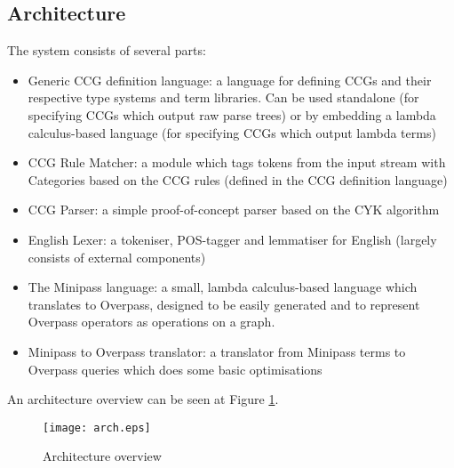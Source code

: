 \documentclass[main.tex]{subfiles}
\begin{document}
\subsection{Architecture}
The system consists of several parts:
\begin{itemize}
    \item Generic CCG definition language: a language for defining CCGs and
          their respective type systems and term libraries. Can be used
          standalone (for specifying CCGs which output raw parse trees)
          or by embedding a lambda calculus-based language (for specifying
          CCGs which output lambda terms)

    \item CCG Rule Matcher: a module which tags tokens from the input stream
          with Categories based on the CCG rules (defined in the CCG definition
          language)

    \item CCG Parser: a simple proof-of-concept parser based on the CYK
          algorithm

    \item English Lexer: a tokeniser, POS-tagger and lemmatiser for English
          (largely consists of external components)

    \item The Minipass language: a small, lambda calculus-based language
          which translates to Overpass, designed to be easily generated and
          to represent Overpass operators as operations on a graph.

    \item Minipass to Overpass translator: a translator from Minipass terms
          to Overpass queries which does some basic optimisations
\end{itemize}

An architecture overview can be seen at Figure \ref{arch}.


\begin{figure}[htbp!]
    \texttt{[image: arch.eps]}
    \caption{Architecture overview}
    \label{arch}
\end{figure}
\end{document}
